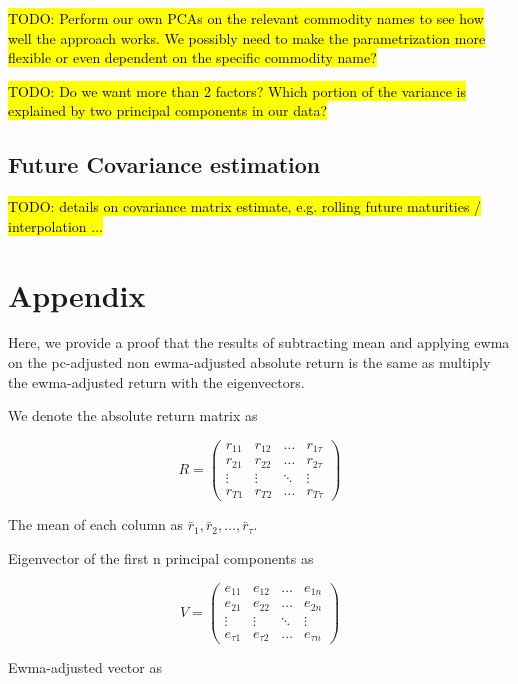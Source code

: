 \documentclass{amsart}
\theoremstyle{plain}
\numberwithin{equation}{section}
\begin{document}
\hl{TODO: Perform our own PCAs on the relevant commodity names to see how well the approach works. We possibly need to
  make the parametrization more flexible or even dependent on the specific commodity name?}

\hl{TODO: Do we want more than 2 factors? Which portion of the variance is explained by two principal components in our
  data?}

\subsection{Future Covariance estimation}

\hl{TODO: details on covariance matrix estimate, e.g. rolling future maturities / interpolation ...}

\section{Appendix}
Here, we provide a proof that the results of subtracting mean and applying ewma on the pc-adjusted non ewma-adjusted absolute return is the same as multiply the ewma-adjusted return with the eigenvectors.

We denote the absolute return matrix as

\begin{equation}
R=\begin{pmatrix}
r_{11} & r_{12} & \ldots & r_{1\tau} \\
r_{21} & r_{22} & \ldots & r_{2\tau} \\
\vdots & \vdots & \ddots & \vdots \\
r_{T1} & r_{T2} & \ldots & r_{T\tau}
\end{pmatrix}
\end{equation}

The mean of each column as $\bar{r}_1, \bar{r}_2, \ldots, \bar{r}_\tau$.

Eigenvector of the first n principal components as

\begin{equation}
V=\begin{pmatrix}
e_{11} & e_{12} & \ldots & e_{1n} \\
e_{21} & e_{22} & \ldots & e_{2n} \\
\vdots & \vdots & \ddots & \vdots \\
e_{\tau1} & e_{\tau2} & \ldots & e_{\tau n}
\end{pmatrix}
\end{equation}

Ewma-adjusted vector as
\end{document}
